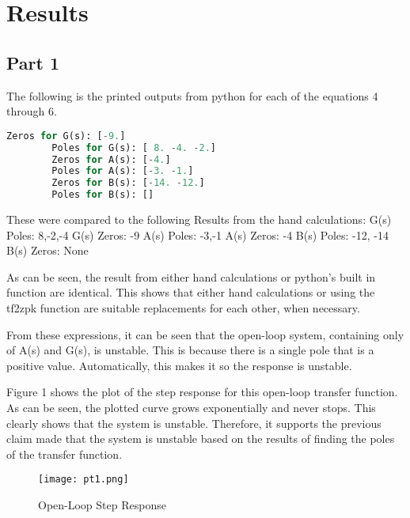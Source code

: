 \documentclass[12pt, titlepage]{article}
\begin{document}
    \section{Results}
    \subsection{Part 1}
    The following is the printed outputs from python for each of the equations 4 through 6.
        
      \begin{lstlisting}[language=Python]  
        Zeros for G(s): [-9.] 
        Poles for G(s): [ 8. -4. -2.]
        Zeros for A(s): [-4.] 
        Poles for A(s): [-3. -1.]
        Zeros for B(s): [-14. -12.] 
        Poles for B(s): []
        \end{lstlisting}
        
    These were compared to the following Results from the hand calculations:
    \newline
    G(s) Poles: 8,-2,-4 \newline
    G(s) Zeros: -9 \newline
    A(s) Poles: -3,-1 \newline
    A(s) Zeros: -4 \newline
    B(s) Poles: -12, -14 \newline
    B(s) Zeros: None \newline
    
    As can be seen, the result from either hand calculations or python's built in function are identical.  This shows that either hand calculations or using the tf2zpk function are suitable replacements for each other, when necessary.
    
    From these expressions, it can be seen that the open-loop system, containing only of A(s) and G(s), is unstable.  This is because there is a single pole that is a positive value.  Automatically, this makes it so the response is unstable.
    
    Figure 1 shows the plot of the step response for this open-loop transfer function.  As can be seen, the plotted curve grows exponentially and never stops.  This clearly shows that the system is unstable.  Therefore, it supports the previous claim made that the system is unstable based on the results of finding the poles of the transfer function.
    
    \begin{figure}[h!]
        \centering
        \texttt{[image: pt1.png]}
        \caption{Open-Loop Step Response}
        \label{fig:my_label}
    \end{figure}
    
\end{document}
